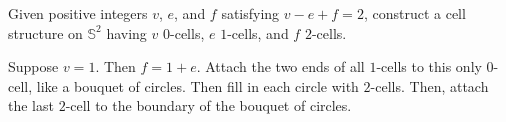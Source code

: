 \setcounter{question}{13}
\question Given positive integers $v$, $e$, and $f$ satisfying $v-e+f=2$,
construct a cell structure on $\mathbb{S}^2$ having $v$ $0$-cells, $e$
$1$-cells, and $f$ $2$-cells.

\begin{solution}
%
Suppose $v=1$. Then $f = 1+e$. Attach the two ends of all $1$-cells to this only
$0$-cell, like a bouquet of circles. Then fill in each circle with $2$-cells.
Then, attach the last $2$-cell to the boundary of the bouquet of circles.
%
\end{solution}